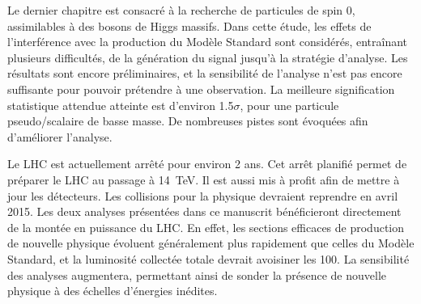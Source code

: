 \smallskip

Le dernier chapitre est consacré à la recherche de particules de spin 0, assimilables à des bosons de Higgs massifs. Dans cette étude, les effets de l'interférence avec la production du Modèle Standard sont considérés, entraînant plusieurs difficultés, de la génération du signal jusqu'à la stratégie d'analyse. Les résultats sont encore préliminaires, et la sensibilité de l'analyse n'est pas encore suffisante pour pouvoir prétendre à une observation. La meilleure signification statistique attendue atteinte est d'environ \num{1.5}$\sigma$, pour une particule pseudo\-/scalaire de basse masse. De nombreuses pistes sont évoquées afin d'améliorer l'analyse.

\bigskip

Le LHC est actuellement arrêté pour environ 2 ans. Cet arrêt planifié permet de préparer le LHC au passage à \SI{14}{\TeV}. Il est aussi mis à profit afin de mettre à jour les détecteurs. Les collisions \Pproton{}\Pproton{} pour la physique devraient reprendre en avril 2015. Les deux analyses présentées dans ce manuscrit bénéficieront directement de la montée en puissance du LHC. En effet, les sections efficaces de production de nouvelle physique évoluent généralement plus rapidement que celles du Modèle Standard, et la luminosité collectée totale devrait avoisiner les \SI{100}{\invfb}. La sensibilité des analyses augmentera, permettant ainsi de sonder la présence de nouvelle physique à des échelles d'énergies inédites.